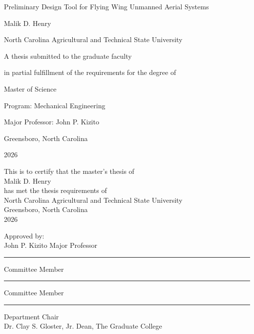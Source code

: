\documentclass[12pt]{report}
\begin{document}
\begin{titlepage}
  \centering
  {\Large Preliminary Design Tool for Flying Wing Unmanned Aerial Systems\par}
  \vspace{1.25in}
  {\large Malik D. Henry\par}
  \vspace{0.6in}
  {\large North Carolina Agricultural and Technical State University\par}
  \vspace{0.4in}
  {\large A thesis submitted to the graduate faculty\par}
  {\large in partial fulfillment of the requirements for the degree of\par}
  \vspace{0.4in}
  {\large Master of Science\par}
  {\large Program: Mechanical Engineering\par}
  \vspace{0.4in}
  {\large Major Professor: John P. Kizito\par}
  \vfill
  {\large Greensboro, North Carolina\par}
  {\large 2026\par}
\end{titlepage}

\clearpage
\thispagestyle{empty}
\begin{center}
  This is to certify that the master's thesis of\\[0.15in]
  Malik D. Henry\\[0.15in]
  has met the thesis requirements of\\[0.15in]
  North Carolina Agricultural and Technical State University\\[0.15in]
  Greensboro, North Carolina\\[0.35in]
  2026
\end{center}

\vspace{0.4in}
\noindent Approved by:\\[0.45in]
\noindent John P. Kizito \hfill Major Professor\\[0.45in]
\noindent \rule{3.5in}{0.4pt} \hfill Committee Member\\[0.45in]
\noindent \rule{3.5in}{0.4pt} \hfill Committee Member\\[0.45in]
\noindent \rule{3.5in}{0.4pt} \hfill Department Chair\\[0.45in]
\noindent Dr. Clay S. Gloster, Jr. \hfill Dean, The Graduate College
\end{document}
